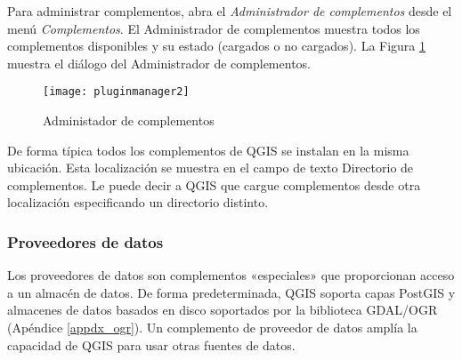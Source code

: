 Para administrar complementos, abra el \textsl{Administrador de complementos} desde el menú \textsl{Complementos}. El Administrador de complementos muestra todos los complementos disponibles y su estado (cargados o no cargados). La Figura \ref{fig:pluginmanager} muestra el diálogo del Administrador de complementos.

\begin{figure}[ht]
   \begin{center}
   \caption{Administador de complementos}\label{fig:pluginmanager}\smallskip
   \texttt{[image: pluginmanager2]}
\end{center}  
\end{figure}

De forma típica todos los complementos de QGIS se instalan en la misma ubicación. Esta localización se muestra en el campo de texto Directorio de complementos. Le puede decir a QGIS que cargue complementos desde otra localización especificando un directorio distinto.

\begin{Tip}\caption{\textsc{Complementos que se cuelgan}}
\end{Tip} 

\subsubsection{Proveedores de datos}

Los proveedores de datos son complementos «especiales» que proporcionan acceso a un almacén de datos. De forma predeterminada, QGIS soporta capas PostGIS y almacenes de datos basados en disco soportados por la biblioteca GDAL/OGR (Apéndice \ref{appdx_ogr}). Un complemento de proveedor de datos amplía la capacidad de QGIS para usar otras fuentes de datos.

